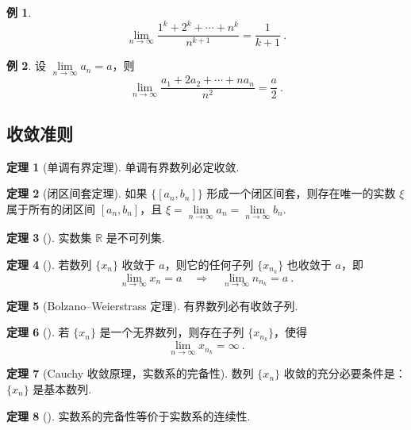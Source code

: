 \documentclass[zihao=-4,linespread=1.8,UTF8,nothm]{aytony_base}
\theoremstyle{definition}
\newtheorem{theorem}{\indent\heiti\textbf{定理}}[subsection]
\newtheorem{example}{\indent\heiti\textbf{例}}[subsection]
\begin{document}
\begin{example}
    $$
        \lim\limits_{n \to \infty} \dfrac{1^k+2^k+\cdots + n^k}{n^{k+1}} = \dfrac{1}{k+1}\ .
    $$
\end{example}

\begin{example}
    设 $\lim\limits_{n \to \infty} a_n = a$，则 $$
        \lim\limits_{n \to \infty} \dfrac{a_1 + 2a_2 + \cdots + na_n}{n^2} = \dfrac{a}{2}\ .
    $$
\end{example}

\subsection{收敛准则}

\begin{theorem}[单调有界定理]
    单调有界数列必定收敛.
\end{theorem}

\begin{theorem}[闭区间套定理]
    如果 $\{[a_n, b_n]\}$ 形成一个闭区间套，则存在唯一的实数 $\xi$ 属于所有的闭区间 $[a_n, b_n]$，且 $\xi = \lim\limits_{n \to \infty} a_n = \lim\limits_{n \to \infty} b_n$.
\end{theorem}

\begin{theorem}[]
    实数集 $\mathbb{R}$ 是不可列集.
\end{theorem}

\begin{theorem}[]
    若数列 $\{x_n\}$ 收敛于 $a$，则它的任何子列 $\{x_{n_k}\}$ 也收敛于 $a$，即 $$
        \lim\limits_{n \to \infty} x_n = a \quad \Rightarrow \quad \lim\limits_{n \to \infty} n_{n_k} = a\ .$$
\end{theorem}

\begin{theorem}[Bolzano--Weierstrass 定理]
    有界数列必有收敛子列.
\end{theorem}

\begin{theorem}[]
    若 $\{x_n\}$ 是一个无界数列，则存在子列 $\{x_{n_k}\}$，使得 $$
        \lim\limits_{n \to \infty} x_{n_k} = \infty\ .
    $$
\end{theorem}

\begin{theorem}[Cauchy 收敛原理，实数系的完备性]
    数列 $\{x_n\}$ 收敛的充分必要条件是：$\{x_n\}$ 是基本数列.
\end{theorem}

\begin{theorem}[]
    实数系的完备性等价于实数系的连续性.
\end{theorem}
\end{document}
